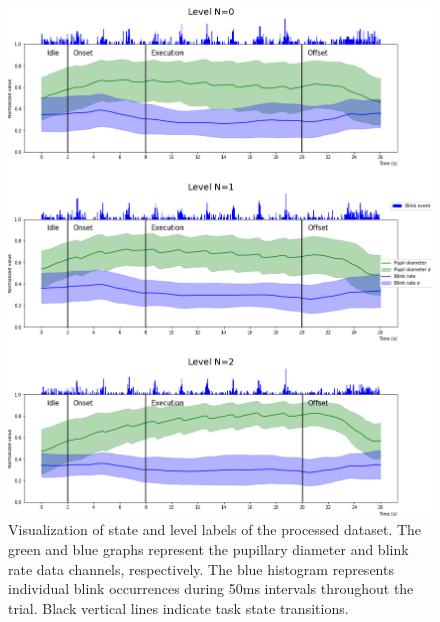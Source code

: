 \begin{figure}[h]
    \centering
    \includegraphics[width=\textwidth]{figures/impl_statelevelvisualization_pbr.png}
    \caption{Visualization of state and level labels of the processed dataset. The green and blue graphs represent the pupillary diameter and blink rate data channels, respectively. The blue histogram represents individual blink occurrences during 50ms intervals throughout the trial. Black vertical lines indicate task state transitions.}
    \label{fig:res/statelevel_pbr}
\end{figure}

